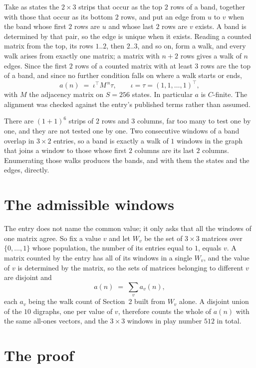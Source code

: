 \documentclass[11pt,a4paper]{article}
\theoremstyle{plain}
\theoremstyle{definition}
\begin{document}
Take as states the $2\times3$ strips that occur as the top $2$ rows of a band,
together with those that occur as its bottom $2$ rows, and put an edge from $u$ to $v$
when the band whose first $2$ rows are $u$ and whose last $2$ rows are $v$ exists.
A band is determined by that pair, so the edge is unique when it exists. Reading a counted
matrix from the top, its rows $1..2$, then $2..3$, and so on, form a walk, and every
walk arises from exactly one matrix; a matrix with $n+2$ rows gives a walk of $n$ edges.
Since the first $2$ rows of a counted matrix with at least $3$ rows are the top of a
band, and since no further condition falls on where a walk starts or ends,
\[
a(n)\;=\;\iota^{\!\top}M^{\,n}\tau ,\qquad \iota=\tau=(1,1,\dots,1)^{\!\top},
\]
with $M$ the adjacency matrix on $S=256$ states. In particular $a$ is $C$-finite. The
alignment was checked against the entry's published terms rather than assumed.

There are $(1 + 1)^{6}$ strips of $2$ rows and $3$ columns, far too
many to test one by one, and they are not tested one by one. Two consecutive windows of a band
overlap in $3\times2$ entries, so a band is exactly a walk of $1$ windows in
the graph that joins a window to those whose first $2$ columns are its last $2$
columns. Enumerating those walks produces the bands, and with them the states and the edges,
directly.

\section{The admissible windows}

The entry does not name the common value; it only asks that all the windows of one matrix agree.
So fix a value $v$ and let $W_v$ be the set of $3\times3$ matrices over
$\{0,\dots,1\}$ whose population, the number of its entries equal to $1$, equals $v$. A matrix counted by the entry has all of
its windows in a single $W_v$, and the value of $v$ is determined by the matrix, so the sets of
matrices belonging to different $v$ are disjoint and
\[
a(n)\;=\;\sum_v a_v(n),
\]
each $a_v$ being the walk count of Section~2 built from $W_v$ alone. A disjoint union of the
$10$ digraphs, one per value of $v$, therefore counts the whole of $a(n)$ with the same
all-ones vectors, and the $3\times3$ windows in play number $512$ in total.

\section{The proof}
\end{document}
